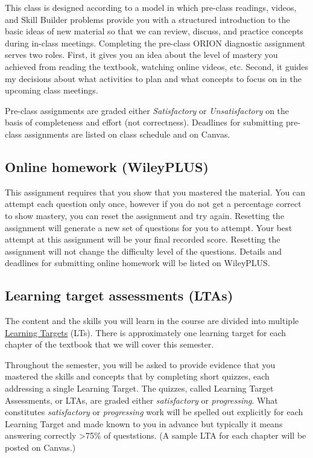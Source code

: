 This class is designed according to a model in which pre-class readings,
videos, and Skill Builder problems provide you with a structured
introduction to the basic ideas of new material so that we can review,
discuss, and practice concepts during in-class meetings. Completing the
pre-class ORION diagnostic assignment serves two roles. First, it gives
you an idea about the level of mastery you achieved from reading the
textbook, watching online videos, etc. Second, it guides my decisions
about what activities to plan and what concepts to focus on in the
upcoming class meetings.

Pre-class assignments are graded either \emph{Satisfactory} or
\emph{Unsatisfactory} on the basis of completeness and effort (not
correctness). Deadlines for submitting pre-class assignments are listed
on class schedule and on Canvas.

\hypertarget{online-homework-wileyplus}{%
\subsection{Online homework
(WileyPLUS)}\label{online-homework-wileyplus}}

This assignment requires that you show that you mastered the material.
You can attempt each question only once, however if you do not get a
percentage correct to show mastery, you can reset the assignment and try
again. Resetting the assignment will generate a new set of questions for
you to attempt. Your best attempt at this assignment will be your final
recorded score. Resetting the assignment will not change the difficulty
level of the questions. Details and deadlines for submitting online
homework will be listed on WileyPLUS.

\hypertarget{learning-target-assessments-ltas}{%
\subsection{Learning target assessments
(LTAs)}\label{learning-target-assessments-ltas}}

The content and the skills you will learn in the course are divided into
multiple \protect\hyperlink{LT}{Learning Targets} (LTs). There is
approximately one learning target for each chapter of the textbook that
we will cover this semester.

Throughout the semester, you will be asked to provide evidence that you
mastered the skills and concepts that by completing short quizzes, each
addressing a single Learning Target. The quizzes, called Learning Target
Assessments, or LTAs, are graded either \emph{satisfactory} or
\emph{progressing}. What constitutes \emph{satisfactory} or
\emph{progressing} work will be spelled out explicitly for each Learning
Target and made known to you in advance but typically it means answering
correctly \textgreater75\% of queststions. (A sample LTA for each
chapter will be posted on Canvas.)

